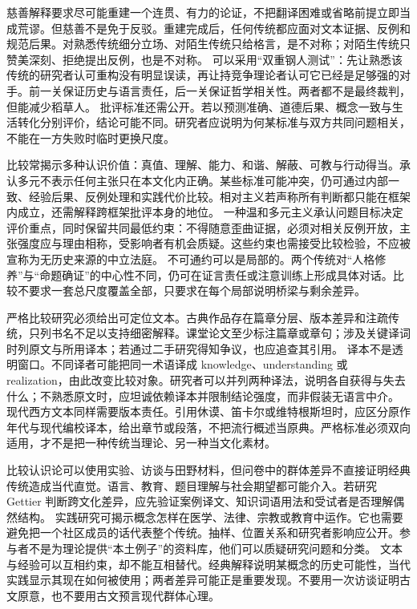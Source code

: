 慈善解释要求尽可能重建一个连贯、有力的论证，不把翻译困难或省略前提立即当成荒谬。但慈善不是免于反驳。重建完成后，任何传统都应面对文本证据、反例和规范后果。对熟悉传统细分立场、对陌生传统只给格言，是不对称；对陌生传统只赞美深刻、拒绝提出反例，也是不对称。 可以采用“双重钢人测试”：先让熟悉该传统的研究者认可重构没有明显误读，再让持竞争理论者认可它已经是足够强的对手。前一关保证历史与语言责任，后一关保证哲学相关性。两者都不是最终裁判，但能减少稻草人。 批评标准还需公开。若以预测准确、道德后果、概念一致与生活转化分别评价，结论可能不同。研究者应说明为何某标准与双方共同问题相关，不能在一方失败时临时更换尺度。

比较常揭示多种认识价值：真值、理解、能力、和谐、解蔽、可教与行动得当。承认多元不表示任何主张只在本文化内正确。某些标准可能冲突，仍可通过内部一致、经验后果、反例处理和实践代价比较。相对主义若声称所有判断都只能在框架内成立，还需解释跨框架批评本身的地位。 一种温和多元主义承认问题目标决定评价重点，同时保留共同最低约束：不得随意歪曲证据，必须对相关反例开放，主张强度应与理由相称，受影响者有机会质疑。这些约束也需接受比较检验，不应被宣称为无历史来源的中立法庭。 不可通约可以是局部的。两个传统对“人格修养”与“命题确证”的中心性不同，仍可在证言责任或注意训练上形成具体对话。比较不要求一套总尺度覆盖全部，只要求在每个局部说明桥梁与剩余差异。

严格比较研究必须给出可定位文本。古典作品存在篇章分层、版本差异和注疏传统，只列书名不足以支持细密解释。课堂论文至少标注篇章或章句；涉及关键译词时列原文与所用译本；若通过二手研究得知争议，也应追查其引用。 译本不是透明窗口。不同译者可能把同一术语译成 knowledge、understanding 或 realization，由此改变比较对象。研究者可以并列两种译法，说明各自获得与失去什么；不熟悉原文时，应坦诚依赖译本并限制结论强度，而非假装无语言中介。 现代西方文本同样需要版本责任。引用休谟、笛卡尔或维特根斯坦时，应区分原作年代与现代编校译本，给出章节或段落，不把流行概述当原典。严格标准必须双向适用，才不是把一种传统当理论、另一种当文化素材。

比较认识论可以使用实验、访谈与田野材料，但问卷中的群体差异不直接证明经典传统造成当代直觉。语言、教育、题目理解与社会期望都可能介入。若研究 Gettier 判断跨文化差异，应先验证案例译文、知识词语用法和受试者是否理解偶然结构。 实践研究可揭示概念怎样在医学、法律、宗教或教育中运作。它也需要避免把一个社区成员的话代表整个传统。抽样、位置关系和研究者影响应公开。参与者不是为理论提供“本土例子”的资料库，他们可以质疑研究问题和分类。 文本与经验可以互相约束，却不能互相替代。经典解释说明某概念的历史可能性，当代实践显示其现在如何被使用；两者差异可能正是重要发现。不要用一次访谈证明古文原意，也不要用古文预言现代群体心理。

